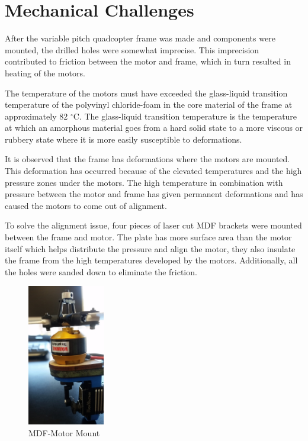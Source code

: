 \newpage

\section{Mechanical Challenges}


After the variable pitch quadcopter frame was made and components were mounted, the drilled holes were somewhat imprecise. This imprecision contributed to friction between the motor and frame, which in turn resulted in heating of the motors.\bigskip

The temperature of the motors must have exceeded the glass-liquid transition temperature of the polyvinyl chloride-foam in the core material of the frame at approximately 82 $^{\circ}$C. The glass-liquid transition temperature is the temperature at which an amorphous material goes from a hard solid state to a more viscous or rubbery state where it is more easily susceptible to deformations. \bigskip

It is observed that the frame has deformations where the motors are mounted. This deformation has occurred because of the elevated temperatures and the high pressure zones under the motors. The high temperature in combination with pressure between the motor and frame has given permanent deformations and has caused the motors to come out of alignment.  \bigskip

To solve the alignment issue, four pieces of laser cut MDF brackets were mounted between the frame and motor. The plate has more surface area than the motor itself which helps distribute the pressure and align the motor, they also insulate the frame from the high temperatures developed by the motors. Additionally, all the holes were sanded down to eliminate the friction. \\

\begin{figure}
  \begin{center}
    \includegraphics[width = 0.3\textwidth]{VAPIQ-PICTURES/MDFmotorPlate}
  \end{center}
  \caption{MDF-Motor Mount}
\end{figure}

